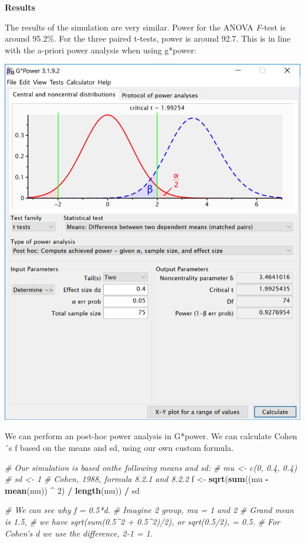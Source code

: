 \documentclass[]{book}
\newenvironment{Shaded}{\begin{snugshade}}{\end{snugshade}}
\newcommand{\CommentTok}[1]{\textcolor[rgb]{0.56,0.35,0.01}{\textit{#1}}}
\newcommand{\DecValTok}[1]{\textcolor[rgb]{0.00,0.00,0.81}{#1}}
\newcommand{\KeywordTok}[1]{\textcolor[rgb]{0.13,0.29,0.53}{\textbf{#1}}}
\newcommand{\NormalTok}[1]{#1}
\newcommand{\OperatorTok}[1]{\textcolor[rgb]{0.81,0.36,0.00}{\textbf{#1}}}
\newcommand{\StringTok}[1]{\textcolor[rgb]{0.31,0.60,0.02}{#1}}
\begin{document}
\textbf{Results}

The results of the simulation are very similar. Power for the ANOVA \emph{F}-test is around 95.2\%. For the three paired t-tests, power is around 92.7. This is in line with the a-priori power analysis when using g*power:

\includegraphics{screenshots/gpower_2.png}

We can perform an post-hoc power analysis in G*power. We can calculate Cohen´s f based on the means and sd, using our own custom formula.

\begin{Shaded}
\begin{Highlighting}[]
\CommentTok{# Our simulation is based onthe following means and sd:}
\CommentTok{# mu <- c(0, 0.4, 0.4)}
\CommentTok{# sd <- 1}
\CommentTok{# Cohen, 1988, formula 8.2.1 and 8.2.2}
\NormalTok{f <-}\StringTok{ }\KeywordTok{sqrt}\NormalTok{(}\KeywordTok{sum}\NormalTok{((mu }\OperatorTok{-}\StringTok{ }\KeywordTok{mean}\NormalTok{(mu)) }\OperatorTok{^}\StringTok{ }\DecValTok{2}\NormalTok{) }\OperatorTok{/}\StringTok{ }\KeywordTok{length}\NormalTok{(mu)) }\OperatorTok{/}\StringTok{ }\NormalTok{sd }

\CommentTok{# We can see why f = 0.5*d.}
\CommentTok{# Imagine 2 group, mu = 1 and 2}
\CommentTok{# Grand mean is 1.5, }
\CommentTok{# we have sqrt(sum(0.5^2 + 0.5^2)/2), or sqrt(0.5/2), = 0.5.}
\CommentTok{# For Cohen's d we use the difference, 2-1 = 1. }
\end{Highlighting}
\end{Shaded}
\end{document}
